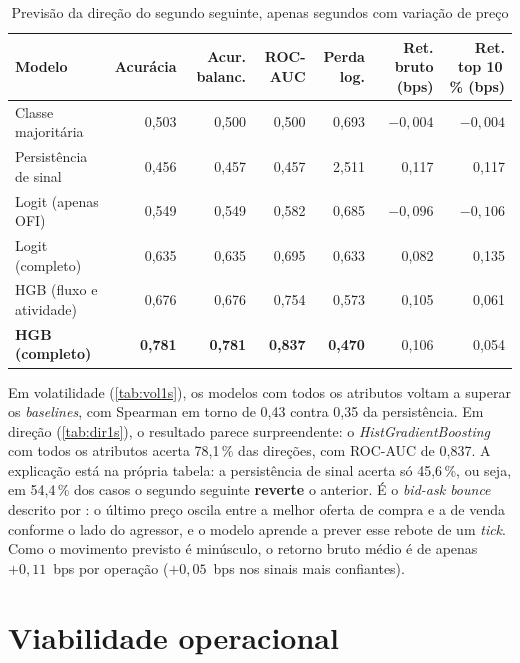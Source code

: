 \begin{table}[htbp]
\caption{\label{tab:dir1s}Previsão da direção do segundo seguinte, apenas segundos com variação de preço}
\begin{corpotabela}
\setlength{\tabcolsep}{4pt}
\begin{tabularx}{\textwidth}{L{3.6cm}RRRRRR}
\toprule
Modelo & Acurácia & Acur. balanc. & ROC-AUC & Perda log. & Ret. bruto (bps) & Ret. top 10\,\% (bps) \\
\midrule
Classe majoritária & 0,503 & 0,500 & 0,500 & 0,693 & $-0,004$ & $-0,004$ \\
Persistência de sinal & 0,456 & 0,457 & 0,457 & 2,511 & 0,117 & 0,117 \\
Logit (apenas OFI) & 0,549 & 0,549 & 0,582 & 0,685 & $-0,096$ & $-0,106$ \\
Logit (completo) & 0,635 & 0,635 & 0,695 & 0,633 & 0,082 & 0,135 \\
HGB (fluxo e atividade) & 0,676 & 0,676 & 0,754 & 0,573 & 0,105 & 0,061 \\
\textbf{HGB (completo)} & \textbf{0,781} & \textbf{0,781} & \textbf{0,837} & \textbf{0,470} & 0,106 & 0,054 \\
\bottomrule
\end{tabularx}
\end{corpotabela}
\fontedados
\end{table}

Em volatilidade (\autoref{tab:vol1s}), os modelos com todos os atributos voltam a
superar os \textit{baselines}, com Spearman em torno de 0,43 contra 0,35 da
persistência. Em direção (\autoref{tab:dir1s}), o resultado parece
surpreendente: o \textit{HistGradientBoosting} com todos os atributos acerta
78,1\,\% das direções, com ROC-AUC de 0,837. A explicação está na própria tabela:
a persistência de sinal acerta só 45,6\,\%, ou seja, em 54,4\,\% dos casos o
segundo seguinte \textbf{reverte} o anterior. É o \textit{bid-ask bounce}
descrito por : o último preço oscila entre a melhor
oferta de compra e a de venda conforme o lado do agressor, e o modelo aprende a
prever esse rebote de um \textit{tick}. Como o movimento previsto é minúsculo, o
retorno bruto médio é de apenas $+0,11$~bps por operação ($+0,05$~bps nos sinais
mais confiantes).

\section{Viabilidade operacional}\label{sec:viabilidade}


